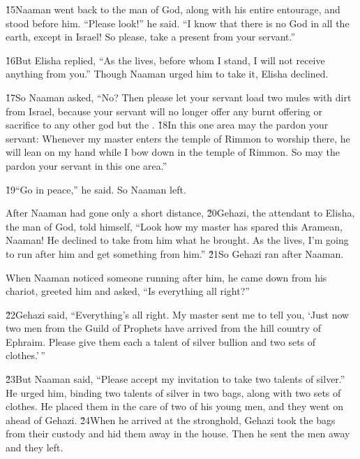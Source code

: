 \v{15}Naaman went back to the man of God, along with his entire entourage, and stood before him. ``Please look!'' he said. ``I know that there is no God in all the earth, except in Israel! So please, take a present from your servant.''

\v{16}But Elisha replied, ``As the  lives, before whom I stand, I will not receive anything from you.'' Though Naaman urged him to take it, Elisha declined.

\v{17}So Naaman asked, ``No? Then please let your servant load two mules with dirt from Israel, because your servant will no longer offer any burnt offering or sacrifice to any other god but the . \v{18}In this one area may the  pardon your servant: Whenever my master enters the temple of Rimmon to worship there, he will lean on my hand while I bow down in the temple of Rimmon. So may the  pardon your servant in this one area.''

\v{19}``Go in peace,'' he said. So Naaman left.

After Naaman had gone only a short distance, \v{20}Gehazi, the attendant to Elisha, the man of God, told himself, ``Look how my master has spared this Aramean, Naaman! He declined to take from him what he brought. As the  lives, I'm going to run after him and get something from him.'' \v{21}So Gehazi ran after Naaman.

When Naaman noticed someone running after him, he came down from his chariot, greeted him and asked, ``Is everything all right?''

\v{22}Gehazi said, ``Everything's all right. My master sent me to tell you, `Just now two men from the Guild of Prophets have arrived from the hill country of Ephraim. Please give them each a talent of silver bullion and two sets of clothes.'\,''

\v{23}But Naaman said, ``Please accept my invitation to take two talents of silver.'' He urged him, binding two talents of silver in two bags, along with two sets of clothes. He placed them in the care of two of his young men, and they went on ahead of Gehazi. \v{24}When he arrived at the stronghold, Gehazi took the bags from their custody and hid them away in the house. Then he sent the men away and they left.

